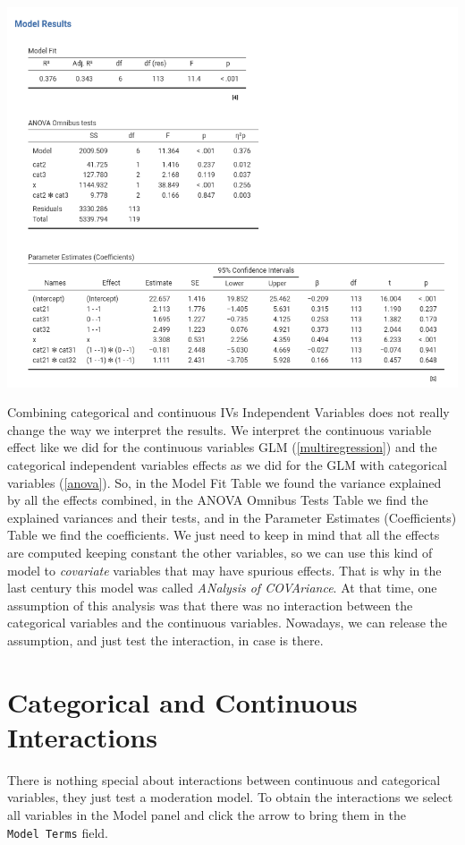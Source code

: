 \documentclass[
]{book}
\begin{document}
\includegraphics{bookletpics/2_ancova_output1.png}

Combining categorical and continuous {IVs {Independent Variables} } does not really change the way we interpret the results. We interpret the continuous variable effect like we did for the continuous variables GLM (\ref{multiregression}) and the categorical independent variables effects as we did for the GLM with categorical variables (\ref{anova}). So, in the {Model Fit} Table we found the variance explained by all the effects combined, in the {ANOVA Omnibus Tests} Table we find the explained variances and their tests, and in the {Parameter Estimates (Coefficients)} Table we find the coefficients. We just need to keep in mind that all the effects are computed keeping constant the other variables, so we can use this kind of model to \emph{covariate} variables that may have spurious effects. That is why in the last century this model was called \emph{ANalysis of COVAriance}. At that time, one assumption of this analysis was that there was no interaction between the categorical variables and the continuous variables. Nowadays, we can release the assumption, and just test the interaction, in case is there.

\hypertarget{moderation2}{%
\section{Categorical and Continuous Interactions}\label{moderation2}}

There is nothing special about interactions between continuous and categorical variables, they just test a moderation model. To obtain the interactions we select all variables in the {Model} panel and click the arrow to bring them in the \texttt{Model\ Terms} field.
\end{document}
